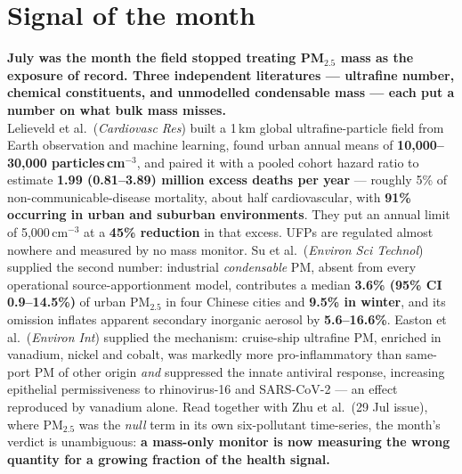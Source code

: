 \documentclass[10pt]{article}
\begin{document}
\vspace{6mm}

\section*{\sffamily\bfseries\color{Deep}Signal of the month}
\vspace{-1.5mm}{\color{Coral}\rule{\linewidth}{1.1pt}}\vspace{2.5mm}

\begin{keybox}
{\sffamily\bfseries\small\color{Deep}July was the month the field stopped treating
PM$_{2.5}$ mass as the exposure of record. Three independent literatures ---
ultrafine number, chemical constituents, and unmodelled condensable mass --- each
put a number on what bulk mass misses.}\\[1.4mm]
\footnotesize
Lelieveld et al.\ (\textit{Cardiovasc Res}) built a 1\,km global ultrafine-particle field
from Earth observation and machine learning, found urban annual means of
\textbf{10{,}000--30{,}000 particles\,cm$^{-3}$}, and paired it with a pooled cohort
hazard ratio to estimate \textbf{1.99 (0.81--3.89) million excess deaths per year} ---
roughly 5\% of non-communicable-disease mortality, about half cardiovascular, with
\textbf{91\% occurring in urban and suburban environments}. They put an annual limit of
5{,}000\,cm$^{-3}$ at a \textbf{45\% reduction} in that excess. UFPs are regulated
almost nowhere and measured by no mass monitor. Su et al.\ (\textit{Environ Sci Technol})
supplied the second number: industrial \emph{condensable} PM, absent from every
operational source-apportionment model, contributes a median \textbf{3.6\% (95\% CI
0.9--14.5\%)} of urban PM$_{2.5}$ in four Chinese cities and \textbf{9.5\% in winter},
and its omission inflates apparent secondary inorganic aerosol by \textbf{5.6--16.6\%}.
Easton et al.\ (\textit{Environ Int}) supplied the mechanism: cruise-ship ultrafine PM,
enriched in vanadium, nickel and cobalt, was markedly more pro-inflammatory than
same-port PM of other origin \emph{and} suppressed the innate antiviral response,
increasing epithelial permissiveness to rhinovirus-16 and SARS-CoV-2 --- an effect
reproduced by vanadium alone. Read together with Zhu et al.\ (29 Jul issue), where
PM$_{2.5}$ was the \emph{null} term in its own six-pollutant time-series, the month's
verdict is unambiguous: \textbf{a mass-only monitor is now measuring the wrong quantity
for a growing fraction of the health signal.}
\end{keybox}
\end{document}
